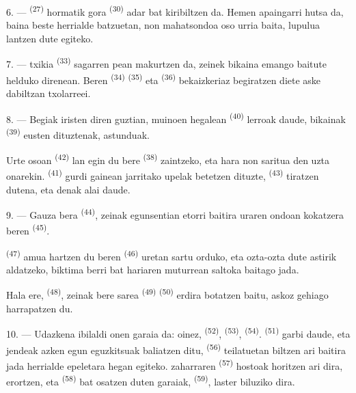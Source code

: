 \VUsaut{6.0mm}
\VUsaut{3.4mm}

6. ---  \textsuperscript{(27)} hormatik gora
 \textsuperscript{(30)} adar bat kiribiltzen da. Hemen apaingarri
hutsa da, baina beste herrialde batzuetan, non mahatsondoa oso urria baita,
lupulua lantzen dute  egiteko.

7. ---  txikia \textsuperscript{(33)} sagarren pean makurtzen
da, zeinek  bikaina emango baitute helduko direnean. Beren
 \textsuperscript{(34)} 
\textsuperscript{(35)} eta  \textsuperscript{(36)} bekaizkeriaz
begiratzen diete aske dabiltzan txolarreei.

8. --- Begiak iristen diren guztian, muinoen hegalean 
\textsuperscript{(40)} lerroak daude,  bikainak
\textsuperscript{(39)} eusten dituztenak,  astunduak.

Urte osoan  \textsuperscript{(42)} lan egin du bere
 \textsuperscript{(38)} zaintzeko, eta hara non saritua den
uzta onarekin.  \textsuperscript{(41)} gurdi gainean
jarritako upelak betetzen dituzte,  \textsuperscript{(43)}
tiratzen dutena, eta denak alai daude.

\VUsaut{5.0mm}
\VUsaut{3.4mm}

9. --- Gauza bera  \textsuperscript{(44)}, zeinak
egunsentian etorri baitira uraren ondoan kokatzera beren 
\textsuperscript{(45)}.

 \textsuperscript{(47)} amua hartzen du beren 
\textsuperscript{(46)} uretan sartu orduko, eta ozta-ozta dute astirik
 aldatzeko, biktima berri bat hariaren muturrean saltoka baitago
jada.

Hala ere,  \textsuperscript{(48)}, zeinak bere sarea
 \textsuperscript{(49)} 
\textsuperscript{(50)} erdira botatzen baitu, askoz gehiago harrapatzen du.

10. --- Udazkena ibilaldi onen garaia da: oinez, 
\textsuperscript{(52)},  \textsuperscript{(53)},
 \textsuperscript{(54)}. 
\textsuperscript{(51)} garbi daude, eta jendeak azken egun eguzkitsuak baliatzen
ditu,  \textsuperscript{(56)} teilatuetan biltzen ari baitira jada
herrialde epeletara hegan egiteko.  zaharraren
\textsuperscript{(57)} hostoak horitzen ari dira,  erortzen, eta
 \textsuperscript{(58)} bat osatzen duten 
garaiak,  \textsuperscript{(59)}, laster biluziko dira.

